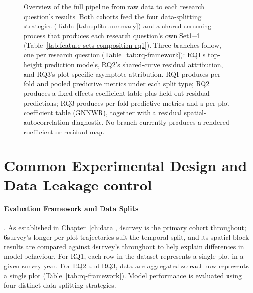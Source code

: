 \documentclass[11pt,a4paper]{report}
\begin{document}
\begin{figure}[!htbp]
\centering
{}
\caption{Overview of the full pipeline from raw data to each research question's results. Both
cohorts feed the four data-splitting strategies
(Table~\ref{tab:splits-summary}) and a shared screening process that produces each research
question's own Set1--4 (Table~\ref{tab:feature-sets-composition-rq1}). Three branches follow, one
per research question (Table~\ref{tab:rq-framework}): RQ1's top-height prediction models, RQ2's
shared-curve residual attribution, and RQ3's plot-specific asymptote attribution. RQ1 produces
per-fold and pooled predictive metrics under each split type; RQ2 produces a fixed-effects
coefficient table plus held-out residual predictions; RQ3 produces per-fold predictive metrics and
a per-plot coefficient table (GNNWR), together with a residual spatial-autocorrelation diagnostic.
No branch currently produces a rendered coefficient or residual
map.}
\label{fig:pipeline-overview}
\end{figure}

\section{Common Experimental Design and Data Leakage control}
\label{sec:common-design}

\paragraph*{Evaluation Framework and Data Splits}. As established in Chapter~\ref{ch:data}, 4survey is the primary cohort throughout; 6survey's longer per-plot trajectories suit the temporal split, and its spatial-block results are compared against 4survey's throughout to help explain differences in model behaviour. For RQ1, each row in the dataset represents a single plot in a given survey year. For RQ2 and RQ3, data are aggregated so each row represents a single plot (Table~\ref{tab:rq-framework}). Model performance is evaluated using four distinct data-splitting strategies.
\end{document}
